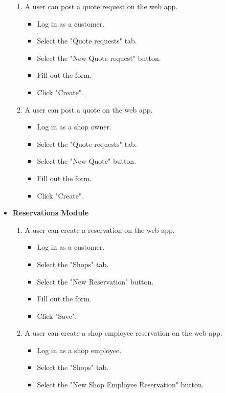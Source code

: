 \documentclass[12pt, titlepage]{article}
\begin{document}
\begin{itemize}
    \begin{enumerate}
        \item A user can post a quote request on the web app.
        \begin{itemize}
            \item Log in as a customer.
            \item Select the "Quote requests" tab.
            \item Select the "New Quote request" button.
            \item Fill out the form.
            \item Click "Create".
        \end{itemize}
        \item A user can post a quote on the web app.
        \begin{itemize}
            \item Log in as a shop owner.
            \item Select the "Quote requests" tab.
            \item Select the "New Quote" button.
            \item Fill out the form.
            \item Click "Create".
        \end{itemize}
    \end{enumerate}
     \item \textbf{Reservations Module}
    \begin{enumerate}
        \item A user can create a reservation on the web app.
        \begin{itemize}
            \item Log in as a customer.
            \item Select the "Shops" tab.
            \item Select the "New Reservation" button.
            \item Fill out the form.
            \item Click "Save".
        \end{itemize}
        \item A user can create a shop employee reservation on the web app.
        \begin{itemize}
            \item Log in as a shop employee.
            \item Select the "Shops" tab.
            \item Select the "New Shop Employee Reservation" button.

\end{itemize}
\end{enumerate}
\end{itemize}
\end{document}
